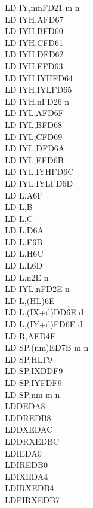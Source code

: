 \documentclass[12pt,twoside,openright,a4paper]{book}
\begin{document}
\begin{multicols}{3}
{\begin{tabbing}
		LD IY,nm\>FD21 m n\\
		LD IYH,A\UNDOC\>FD67\\
		LD IYH,B\UNDOC\>FD60\\
		LD IYH,C\UNDOC\>FD61\\
		LD IYH,D\UNDOC\>FD62\\
		LD IYH,E\UNDOC\>FD63\\
		LD IYH,IYH\UNDOC\>FD64\\
		LD IYH,IYL\UNDOC\>FD65\\
		LD IYH,n\UNDOC\>FD26 n\\
		LD IYL,A\UNDOC\>FD6F\\
		LD IYL,B\UNDOC\>FD68\\
		LD IYL,C\UNDOC\>FD69\\
		LD IYL,D\UNDOC\>FD6A\\
		LD IYL,E\UNDOC\>FD6B\\
		LD IYL,IYH\UNDOC\>FD6C\\
		LD IYL,IYL\UNDOC\>FD6D\\
		LD L,A\>6F\\
		LD L,B\\
		LD L,C\\
		LD L,D\>6A\\
		LD L,E\>6B\\
		LD L,H\>6C\\
		LD L,L\>6D\\
		LD L,n\>2E n\\
		LD IYL,n\UNDOC\>FD2E n\\
		LD L,(HL)\>6E\\
		LD L,(IX+d)\>DD6E d\\
		LD L,(IY+d)\>FD6E d\\
		LD R,A\>ED4F\\
		LD SP,(nm)\>ED7B m n\\
		LD SP,HL\>F9\\
		LD SP,IX\>DDF9\\
		LD SP,IY\>FDF9\\
		LD SP,nm m n\\
		LDD\>EDA8\\
		LDDR\>EDB8\\
		LDDX\ZXN\>EDAC\\
		LDDRX\ZXN\>EDBC\\
		LDI\>EDA0\\
		LDIR\>EDB0\\
		LDIX\ZXN\>EDA4\\
		LDIRX\ZXN\>EDB4\\
		LDPIRX\ZXN\>EDB7\\

\end{tabbing}}
\end{multicols}
\end{document}

